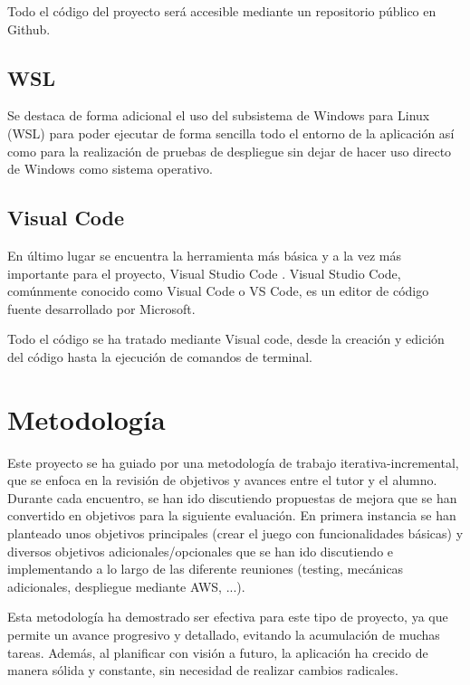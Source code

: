 Todo el código del proyecto será accesible mediante un repositorio público en Github.

\subsection{WSL}

Se destaca de forma adicional el uso del subsistema de Windows para Linux (WSL) \cite{wsl} para poder ejecutar de forma sencilla
todo el entorno de la aplicación así como para la realización de pruebas de despliegue sin dejar de hacer uso directo de Windows
como sistema operativo.

\subsection{Visual Code}

En último lugar se encuentra la herramienta más básica y a la vez más importante para
el proyecto, Visual Studio Code \cite{vscode}. Visual Studio Code, comúnmente conocido como Visual Code o VS Code,
es un editor de código fuente desarrollado por Microsoft.

Todo el código se ha tratado mediante Visual code, desde la creación y edición del código hasta la ejecución de comandos
de terminal.


\section{Metodología}

Este proyecto se ha guiado por una metodología de trabajo iterativa-incremental, que se enfoca en la revisión de objetivos y
avances entre el tutor y el alumno. Durante cada encuentro, se han ido discutiendo propuestas de mejora que se han convertido en
objetivos para la siguiente evaluación. En primera instancia se han planteado unos objetivos principales (crear el juego
con funcionalidades básicas) y diversos objetivos adicionales/opcionales que se han ido discutiendo e
implementando a lo largo de las diferente reuniones (testing, mecánicas adicionales, despliegue mediante AWS, ...).

Esta metodología ha demostrado ser efectiva para este tipo de proyecto, ya que permite un avance progresivo y detallado,
evitando la acumulación de muchas tareas. Además, al planificar con visión a futuro, la aplicación ha crecido de manera sólida
y constante, sin necesidad de realizar cambios radicales.
